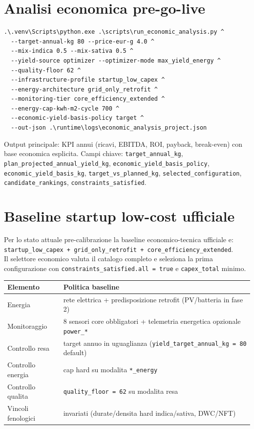 ﻿\documentclass[11pt,a4paper]{report}
\begin{document}
\section{Analisi economica pre-go-live}
\begin{lstlisting}
.\.venv\Scripts\python.exe .\scripts\run_economic_analysis.py ^
  --target-annual-kg 80 --price-eur-g 4.0 ^
  --mix-indica 0.5 --mix-sativa 0.5 ^
  --yield-source optimizer --optimizer-mode max_yield_energy ^
  --quality-floor 62 ^
  --infrastructure-profile startup_low_capex ^
  --energy-architecture grid_only_retrofit ^
  --monitoring-tier core_efficiency_extended ^
  --energy-cap-kwh-m2-cycle 700 ^
  --economic-yield-basis-policy target ^
  --out-json .\runtime\logs\economic_analysis_project.json
\end{lstlisting}
Output principale: KPI annui (ricavi, EBITDA, ROI, payback, break-even) con base economica esplicita.
Campi chiave: \texttt{target\_annual\_kg}, \texttt{plan\_projected\_annual\_yield\_kg},
\texttt{economic\_yield\_basis\_policy}, \texttt{economic\_yield\_basis\_kg},
\texttt{target\_vs\_planned\_kg}, \texttt{selected\_configuration},
\texttt{candidate\_rankings}, \texttt{constraints\_satisfied}.

\section{Baseline startup low-cost ufficiale}
Per lo stato attuale pre-calibrazione la baseline economico-tecnica ufficiale e:
\texttt{startup\_low\_capex + grid\_only\_retrofit + core\_efficiency\_extended}.\\
Il selettore economico valuta il catalogo completo e seleziona la prima configurazione
con \texttt{constraints\_satisfied.all = true} e \texttt{capex\_total} minimo.

\begin{longtable}{@{}p{5.0cm}p{7.0cm}@{}}
\toprule
Elemento & Politica baseline \\ \midrule
Energia & rete elettrica + predisposizione retrofit (PV/batteria in fase 2) \\
Monitoraggio & 8 sensori core obbligatori + telemetria energetica opzionale \texttt{power\_*} \\
Controllo resa & target annuo in uguaglianza (\texttt{yield\_target\_annual\_kg = 80} default) \\
Controllo energia & cap hard su modalita \texttt{*\_energy} \\
Controllo qualita & \texttt{quality\_floor = 62} su modalita resa \\
Vincoli fenologici & invariati (durate/densita hard indica/sativa, DWC/NFT) \\
\bottomrule
\end{longtable}
\end{document}
